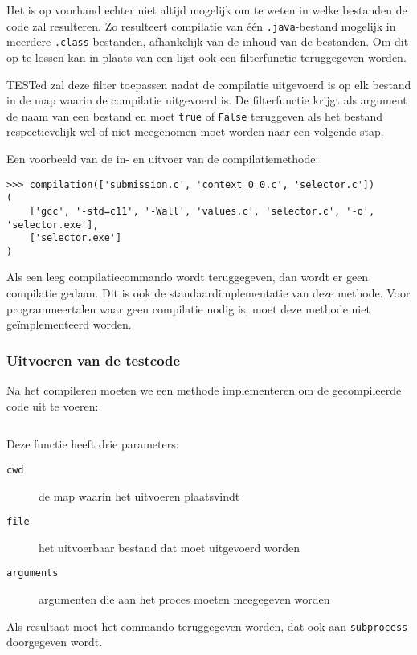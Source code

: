 Het is op voorhand echter niet altijd mogelijk om te weten in welke bestanden de code zal resulteren.
Zo resulteert compilatie van één \texttt{.java}-bestand mogelijk in meerdere \texttt{.class}-bestanden, afhankelijk van de inhoud van de bestanden.
Om dit op te lossen kan in plaats van een lijst ook een filterfunctie teruggegeven worden.

TESTed zal deze filter toepassen nadat de compilatie uitgevoerd is op elk bestand in de map waarin de compilatie uitgevoerd is.
De filterfunctie krijgt als argument de naam van een bestand en moet \texttt{true} of \texttt{False} teruggeven als het bestand respectievelijk wel of niet meegenomen moet worden naar een volgende stap.

Een voorbeeld van de in- en uitvoer van de compilatiemethode:

\begin{verbatim}
>>> compilation(['submission.c', 'context_0_0.c', 'selector.c'])
(
    ['gcc', '-std=c11', '-Wall', 'values.c', 'selector.c', '-o', 'selector.exe'],
    ['selector.exe']
)
\end{verbatim}

Als een leeg compilatiecommando wordt teruggegeven, dan wordt er geen compilatie gedaan.
Dit is ook de standaardimplementatie van deze methode.
Voor programmeertalen waar geen compilatie nodig is, moet deze methode niet geïmplementeerd worden.

\subsubsection{Uitvoeren van de testcode}

Na het compileren moeten we een methode implementeren om de gecompileerde code uit te voeren:

\inputminted[firstline=18,lastline=20,gobble=4]{python}{sources/c-config.py}

Deze functie heeft drie parameters:

\begin{description}
    \item[\texttt{cwd}] de map waarin het uitvoeren plaatsvindt
    \item[\texttt{file}] het uitvoerbaar bestand dat moet uitgevoerd worden
    \item[\texttt{arguments}] argumenten die aan het proces moeten meegegeven worden
\end{description}

Als resultaat moet het commando teruggegeven worden, dat ook aan \texttt{subprocess} doorgegeven wordt.

